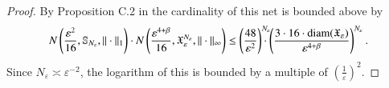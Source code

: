 \begin{proof}
    By Proposition C.2 in \cite{4} the cardinality of this net is bounded above by
    \begin{align*}
     N \left(\frac{\varepsilon^2}{16} , \mathbb{S}_{N_{\varepsilon}}, \| \cdot  \|_1 \right)  \cdot N \left(\frac{\varepsilon^{4+\beta}}{16} , \mathfrak{X}_\varepsilon^{N_{\varepsilon}} , \| \cdot \|_\infty  \right)   \leq \left( \frac{48}{\varepsilon^2} \right)^{N_\varepsilon} \hspace{-0.3cm} \cdot \left( \frac{3 \cdot 16 \cdot \text{diam} (\mathfrak{X}_\varepsilon)}{\varepsilon^{4+\beta}} \right)^{N_\varepsilon}.
     \end{align*}
    Since $N_\varepsilon \asymp \varepsilon^{-2} $, the logarithm of this is bounded by a multiple of
    $\left(\frac{1}{\varepsilon}\right)^2 $.
\end{proof}

